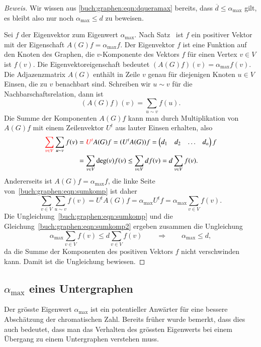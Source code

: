 \begin{proof}[Beweis]
Wir wissen aus \eqref{buch:graphen:eqn:dqueramax} bereits, dass
$\overline{d}\le\alpha_{\text{max}}$ gilt, es bleibt also nur noch
$\alpha_{\text{max}}\le d$ zu beweisen.

Sei $f$ der Eigenvektor zum Eigenwert $\alpha_{\text{max}}$.
Nach Satz~\label{buch:wahrscheinlichkeit:satz:perron-frobenius2}
ist $f$ ein positiver Vektor mit der Eigenschaft $A(G)f=\alpha_{\text{max}}f$.
Der Eigenvektor $f$ ist eine Funktion auf den Knoten des Graphen,
die $v$-Komponente des Vektors $f$ für einen Vertex $v\in V$ ist $f(v)$.
Die Eigenvektoreigenschaft bedeutet $(A(G)f)(v)=\alpha_{\text{max}} f(v)$.
Die Adjazenzmatrix $A(G)$ enthält in Zeile $v$ genau für diejenigen
Knoten $u\in V$ Einsen, die zu $v$ benachbart sind.
Schreiben wir $u\sim v$ für die Nachbarschaftsrelation, dann ist 
\[
(A(G)f)(v)
=
\sum_{u\sim v} f(u).
\]
Die Summe der Komponenten $A(G)f$ kann man durch Multiplikation
von $A(G)f$ mit einem Zeilenvektor $U^t$ aus lauter Einsen erhalten, also
\begin{equation}
\begin{aligned}
{\color{red}
\sum_{v\in V}}\sum_{u\sim v}f(v)
&=
{\color{red}U^t}A(G)f
=
(U^tA(G))f
=
\begin{pmatrix}d_1&d_2&\dots&d_n\end{pmatrix} f
\\
&=
\sum_{v\in V}\deg (v) f(v)
\le
\sum_{v\in V}df(v)
=
d
\sum_{v\in V}f(v).
\end{aligned}
\label{buch:graphen:eqn:sumkomp}
\end{equation}
Andererseits ist $A(G)f=\alpha_{\text{max}}f$, die linke Seite
von~\eqref{buch:graphen:eqn:sumkomp} ist daher
\begin{equation}
\sum_{v\in V}\sum_{u\sim v}f(v)
=
U^tA(G)f
=
\alpha_{\text{max}}
U^tf
=
\alpha_{\text{max}} \sum_{v\in V}f(v).
\label{buch:graphen:eqn:sumkomp2}
\end{equation}
Die Ungleichung~\eqref{buch:graphen:eqn:sumkomp}
und die Gleichung~\eqref{buch:graphen:eqn:sumkomp2} ergeben zusammen
die Ungleichung
\[
\alpha_{\text{max}} \sum_{v\in V}f(v)
\le d\sum_{v\in V}f(v)
\qquad\Rightarrow\qquad
\alpha_{\text{max}} \le d,
\]
da die Summe der Komponenten des positiven Vektors $f$ nicht verschwinden
kann.
Damit ist die Ungleichung bewiesen.
\end{proof}

%
%
\subsection{$\alpha_{\text{max}}$ eines Untergraphen
\label{buch:subsection:alphamax-eines-untergraphen}}
Der grösste Eigenwert $\alpha_{\text{max}}$ ist ein potentieller 
Anwärter für eine bessere Abschätzung der chromatischen Zahl.
Bereits früher wurde bemerkt, dass dies auch bedeutet, dass man 
das Verhalten des grössten Eigenwerts bei einem Übergang zu einem
Untergraphen verstehen muss.

